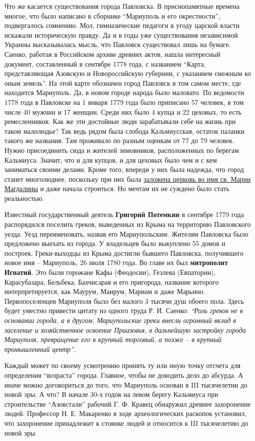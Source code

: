 Что же касается существования города Павловска. В приснопамятные времена
многое, что было написано в сборнике \enquote{Мариуполь и его окрестности},
подвергалось сомнению. Мол, гимназические педагоги в угоду царской власти
искажали историческую правду. Да и в годы уже существования независимой Украины
высказывалась мысль, что Павловск существовал лишь на бумаге. Саенко, работая в
Российском архиве древних актов, нашла интересный документ, составленный в
сентябре 1778 года, с названием \enquote{Карта, представляющая Азовскую и
Новороссийскую губернии, с указанием смежным ко оным земель}. На этой карте
обозначен город Павловск в том самом месте, где находится Мариуполь. Да, в
новом городе народа было маловато. По ведомости 1778 года в Павловске на 1
января 1779 года было приписано 57 человек, в том числе 40 мужчин и 17 женщин.
Среди них было 4 купца и 22 цеховых, то есть ремесленников. Как же эти
достойные люди зарабатывали себе на жизнь при таком малолюдье? Так ведь рядом
была слобода Кальмиусская, остаток паланки такого же названия. Там проживало по
разным оценкам от 77 до 79 человек. Нужно присоединить сюда и жителей
зимовников, расположенных по берегам Кальмиуса. Значит, что и для купцов, и для
цеховых было чем и с кем заниматься своими делами. Кроме того, впереди у них
была надежда, что город станет многолюднее, поскольку при них была
\href{https://archive.org/details/07_04_2018.sergij_burov.mrpl_city.cerkov_sv_marii_magdaliny}{заложена
церковь во имя св. Марии Магдалины} и даже начала строиться. Но мечтам их не
суждено было стать реальностью.

Известный государственный деятель \textbf{Григорий Потемкин} в сентябре 1779 года
распорядился поселить греков, выведенных из Крыма на территорию Павловского
уезда. Уезд переименовать, назвав его Мариупольским. Жителям Павловска было
предложено выехать из города. У владельцев было выкуплено 55 домов и построек.
Греки-выходцы из Крыма достигли бывшего Павловска, получившего новое имя –
Мариуполь, 26 июля 1780 года. Во главе их был \textbf{митрополит Игнатий}. Это были
горожане Кафы (Феодосии), Гезлева (Евпатории), Карасубазара, Бельбека,
Бахчисарая и его пригорода, название которого интерпретируется, как Маурум,
Маирум, Мариам и даже Марьино. Первопоселенцев Мариуполя было без малого 3
тысячи душ обоего пола. Здесь будет уместно привести цитату из одного труда Р.
И. Саенко: \emph{\enquote{Роль греков не в основании города, а в другом. Мариупольские греки
внесли огромный вклад в заселение и хозяйственное освоение Приазовья, в
дальнейшую застройку города Мариуполя, превращение его в крупный торговый, а
позже – в крупный промышленный центр}}.

Каждый может по своему усмотрению принять ту или иную точку отсчета для
определения \enquote{возраста} города. Главное, чтобы не доводить дело до абсурда. А
иначе можно договориться до того, что Мариуполь основан в III тысячелетии до
новой эры. А что? В начале 30-х годов на левом берегу Кальмиуса при
строительстве \enquote{Азовстали} рабочий Г. Ф. Кравец обнаружил древнее захоронение
людей. Профессор Н. Е. Макаренко в ходе археологических раскопок установил, что
захоронение принадлежит к стоянке людей и относится к III тысячелетию до новой
эры.
